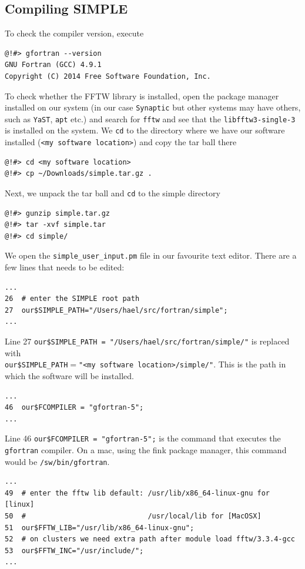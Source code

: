 \documentclass[a4paper,11pt]{article}
\begin{document}
\subsection{Compiling SIMPLE}
\label{compilepc}
To check the compiler version, execute
\begin{verbatim}
@!#> gfortran --version
GNU Fortran (GCC) 4.9.1
Copyright (C) 2014 Free Software Foundation, Inc.
\end{verbatim}
To check whether the FFTW library is installed, open the package manager installed on our system (in our case \texttt{Synaptic} but other systems may have others, such as \texttt{YaST}, \texttt{apt} etc.) and search for \texttt{fftw} and see that the \texttt{libfftw3-single-3} is installed on the system. We \texttt{cd} to the directory  where we have our software installed (\texttt{<my software location>}) and copy the tar ball there
\begin{verbatim}
@!#> cd <my software location>
@!#> cp ~/Downloads/simple.tar.gz .
\end{verbatim}
Next, we unpack the tar ball and \texttt{cd} to the simple directory
\begin{verbatim}
@!#> gunzip simple.tar.gz
@!#> tar -xvf simple.tar
@!#> cd simple/
\end{verbatim}
We open the \texttt{simple\_user\_input.pm} file in our favourite text editor. There are a few lines that needs to be edited:
\begin{verbatim}
...
26  # enter the SIMPLE root path
27  our$SIMPLE_PATH="/Users/hael/src/fortran/simple";
...
\end{verbatim}
Line 27 \texttt{our\$SIMPLE\_PATH = "/Users/hael/src/fortran/simple/"} is replaced with\\
\texttt{our\$SIMPLE\_PATH$=$"<my software location>/simple/"}. This is the path in which the software will be installed.
\begin{verbatim}
...
46  our$FCOMPILER = "gfortran-5";
...
\end{verbatim}
Line 46 \texttt{our\$FCOMPILER = "gfortran-5";} is the command that executes the \texttt{gfortran} compiler. On a mac, using the fink package manager, this command would be \texttt{/sw/bin/gfortran}.
\begin{verbatim}
...
49  # enter the fftw lib default: /usr/lib/x86_64-linux-gnu for [linux]
50  #                             /usr/local/lib for [MacOSX]
51  our$FFTW_LIB="/usr/lib/x86_64-linux-gnu";
52  # on clusters we need extra path after module load fftw/3.3.4-gcc
53  our$FFTW_INC="/usr/include/";
...
\end{verbatim}
\end{document}
